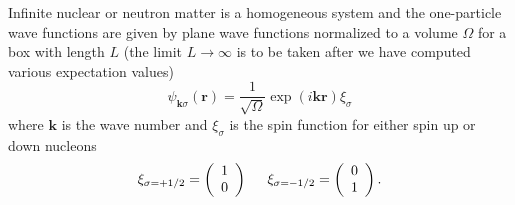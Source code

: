 Infinite nuclear or neutron matter is a homogeneous system and the
one-particle wave functions are given by plane wave functions
normalized to a volume $\Omega$ for a box with length $L$ (the limit
$L\rightarrow \infty$ is to be taken after we have computed various
expectation values)
\[
\psi_{\mathbf{k}\sigma}(\mathbf{r})=
\frac{1}{\sqrt{\Omega}}\exp{(i\mathbf{kr})}\xi_{\sigma}
\]
where $\mathbf{k}$ is the wave number and $\xi_{\sigma}$ is the spin
function for either spin up or down nucleons
\[ 
\xi_{\sigma=+1/2}=\left(\begin{array}{c} 1
  \\ 0 \end{array}\right) \hspace{0.5cm}
\xi_{\sigma=-1/2}=\left(\begin{array}{c} 0 \\ 1 \end{array}\right).
\]

